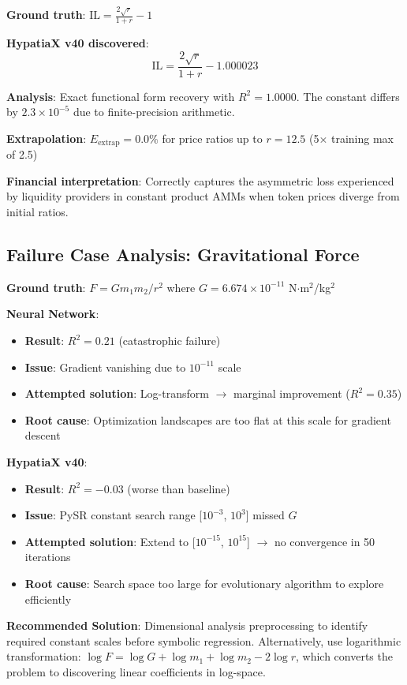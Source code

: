 \begin{example}
\textbf{Ground truth}: $\text{IL} = \frac{2\sqrt{r}}{1+r} - 1$

\textbf{HypatiaX v40 discovered}:
\begin{equation}
\text{IL} = \frac{2\sqrt{r}}{1+r} - 1.000023
\end{equation}

\textbf{Analysis}: Exact functional form recovery with $R^2 = 1.0000$. The constant differs by $2.3 \times 10^{-5}$ due to finite-precision arithmetic.

\textbf{Extrapolation}: $E_{\text{extrap}} = 0.0\%$ for price ratios up to $r = 12.5$ (5$\times$ training max of 2.5)

\textbf{Financial interpretation}: Correctly captures the asymmetric loss experienced by liquidity providers in constant product AMMs when token prices diverge from initial ratios.
\end{example}

\subsection{Failure Case Analysis: Gravitational Force}

\begin{example}
\textbf{Ground truth}: $F = Gm_1m_2/r^2$ where $G = 6.674 \times 10^{-11}$ N$\cdot$m$^2$/kg$^2$

\textbf{Neural Network}:
\begin{itemize}
\item \textbf{Result}: $R^2 = 0.21$ (catastrophic failure)
\item \textbf{Issue}: Gradient vanishing due to $10^{-11}$ scale
\item \textbf{Attempted solution}: Log-transform $\to$ marginal improvement ($R^2 = 0.35$)
\item \textbf{Root cause}: Optimization landscapes are too flat at this scale for gradient descent
\end{itemize}

\textbf{HypatiaX v40}:
\begin{itemize}
\item \textbf{Result}: $R^2 = -0.03$ (worse than baseline)
\item \textbf{Issue}: PySR constant search range [$10^{-3}$, $10^3$] missed $G$
\item \textbf{Attempted solution}: Extend to [$10^{-15}$, $10^{15}$] $\to$ no convergence in 50 iterations
\item \textbf{Root cause}: Search space too large for evolutionary algorithm to explore efficiently
\end{itemize}

\textbf{Recommended Solution}: Dimensional analysis preprocessing to identify required constant scales before symbolic regression. Alternatively, use logarithmic transformation: $\log F = \log G + \log m_1 + \log m_2 - 2\log r$, which converts the problem to discovering linear coefficients in log-space.
\end{example}

